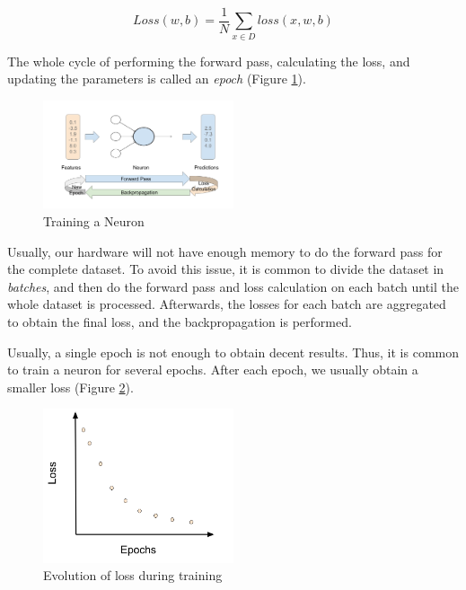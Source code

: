 \begin{equation}
    Loss(w,b) =  \dfrac{1}{N} \sum_{x\in D} loss(x,w,b)
\end{equation}

The whole cycle of performing the forward pass, calculating the loss, and updating the parameters is called an \emph{epoch} (Figure \ref{fig:02_nn_neuron_training}). 

\begin{figure}
    \centering
    \includegraphics[width=0.5\textwidth]{Figures/02/02_neuron_training.png}
    \caption{Training a Neuron}
    \label{fig:02_nn_neuron_training}
\end{figure}

Usually,  our hardware will not have enough memory to do the forward pass for the complete dataset. To avoid this issue, it is common to divide the dataset in \emph{batches}, and then do the forward pass and loss calculation on each batch until the whole dataset is processed. Afterwards, the losses for each batch are aggregated to obtain the final loss, and the backpropagation is performed.

Usually, a single epoch is not enough to obtain decent results. Thus, it is common to train a neuron for several epochs. After each epoch, we usually obtain a smaller loss (Figure \ref{fig:02_nn_loss_evolution}).

\begin{figure}
    \centering
    \includegraphics[width=0.5\textwidth]{Figures/02/02_loss_evolution.png}
    \caption{Evolution of loss during training}
    \label{fig:02_nn_loss_evolution}
\end{figure}

